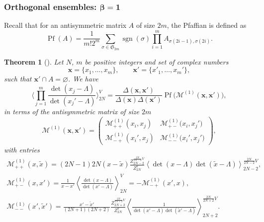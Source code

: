 \documentclass[10pt,a4paper]{amsart}
\numberwithin{equation}{section}
\newtheorem{Theorem}{Theorem}[section]
\newcommand{\mean}[1]{\left\langle{#1}\right\rangle}
\DeclareMathOperator{\pf}{Pf}
\begin{document}
\subsubsection[Orthogonal ensembles: beta = 1]{Orthogonal ensembles: $\boldsymbol{\beta = 1}$}

Recall that for an antisymmetric matrix $A$ of size $2m$, the Pfaffian is defined as
\[
\pf(A) = \frac{1}{m! 2^m} \sum_{\sigma \in \mathfrak{S}_{2m}} \operatorname{sgn}(\sigma) \prod_{i = 1}^{m} A_{\sigma(2i - 1),\sigma(2i)}.
\]

\begin{Theorem}[{\cite[Theorem 1.2.1]{borodin_averages}}]
 \label{th:idbeta1} Let $N$, $m$ be positive integers and set of complex numbers
\[
\bm{x} = \{x_{1}, \ldots, x_{m}\},\qquad \bm{x}' = \{x'_{1}, \ldots,x_{m}'\},
\]
such that $\bm{x}' \cap A = \varnothing$. We have
 \begin{equation*}%
 \Biggl\langle\prod_{j=1}^{m}\frac{\det(x_{j} - \Lambda)}{{\det} (x_{j}' - \Lambda)}\Biggr\rangle_{2N}^{V}
 = \frac{\Delta(\bm{x},\bm{x}')}{\Delta(\bm{x})\Delta(\bm{x}')}\pf\bigl(\mathcal{M}^{(1)}(\bm{x},\bm{x}')\bigr),
 \end{equation*}
 in terms of the antisymmetric matrix of size $2m$
 \begin{equation}
 \label{blockm1}
 \mathcal{M}^{(1)}(\bm{x},\bm{x}') = \begin{pmatrix} \mathcal{M}^{(1)}_{++}(x_i,x_j) & \mathcal{M}^{(1)}_{+-}\big(x_i,x_j'\big) \\ \mathcal{M}^{(1)}_{-+}(x_i',x_j) & \mathcal{M}^{(1)}_{--}\big(x_i',x_j'\big) \end{pmatrix},
\end{equation}
 with entries
 \begin{gather*}%
 \mathcal{M}^{(1)}_{++}(x,\tilde{x}) = (2N -1)2N(x - \tilde{x})\frac{Z^{\frac{2N}{2N-2}V}_{2N-2}}{Z^{V}_{2N}}\mean{\det(x - \Lambda)\det(\tilde{x}- \Lambda)}^{\frac{2N}{2N - 2}V}_{2N-2},\\
 \mathcal{M}^{(1)}_{+-}(x,x') = \frac{1}{x-x'}\mean{\frac{\det(x - \Lambda)}{\det(x' - \Lambda)}}^{V}_{2N} = - \mathcal{M}^{(1)}_{-+}(x',x), \\
 \mathcal{M}_{--}^{(1)}(x',\tilde{x}') = \frac{x'- \tilde{x}'}{(2N+1)(2N+2)}\frac{Z^{\frac{2N}{2N + 2}V}_{2N+2}}{Z^{V}_{2N}} \mean{\frac{1}{\det(x' - \Lambda)\det(\tilde{x}' - \Lambda)}}^{\frac{2N}{2N+2}V}_{2N+2}.
 \end{gather*}
\end{Theorem}
\end{document}
